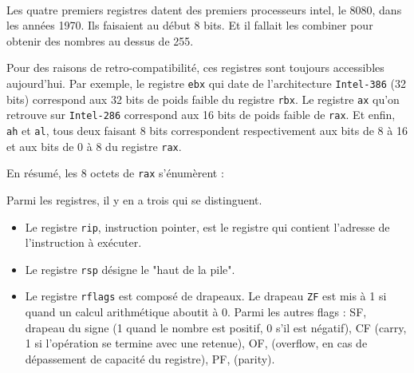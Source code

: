 \documentclass{book}
\newenvironment{commentaire}[1]{%
	\def\FrameCommand{\fboxrule=\FrameRule\fboxsep=\FrameSep \fcolorbox{yellow!50}{yellow!10}}%
	\MakeFramed {\advance\hsize-\width \FrameRestore}
	\noindent {\bf #1}\\
}%
{\endMakeFramed}
\begin{document}
\begin{commentaire}{Les registres ont une histoire}
Les quatre premiers registres datent des premiers processeurs {\sc intel}, le 8080, dans les années 1970. Ils faisaient au début 8 bits. Et il fallait les combiner pour obtenir des nombres au dessus de 255.
	
Pour des raisons de retro-compatibilité, ces registres sont toujours accessibles aujourd'hui. Par exemple, le registre {\tt ebx} qui date de l'architecture {\tt Intel-386} (32 bits) correspond aux 32 bits de poids faible du registre {\tt rbx}. Le registre {\tt ax} qu'on retrouve sur {\tt Intel-286} correspond aux 16 bits de poids faible de {\tt rax}. Et enfin, {\tt ah} et {\tt al}, tous deux faisant 8 bits correspondent respectivement aux bits de 8 à 16 et aux bits de 0 à 8 du registre {\tt rax}.
	
En résumé, les 8 octets de {\tt rax} s'énumèrent :
	\begin{center}
	\end{center}
\end{commentaire}

Parmi les registres, il y en a trois qui se distinguent. 
\begin{itemize}
	\item Le registre {\tt rip}, instruction pointer, est le registre qui contient l'adresse de l'instruction à exécuter. 
	\item Le registre {\tt rsp} désigne le "haut de la pile". 
	\item Le registre {\tt rflags} est composé de drapeaux. Le drapeau {\tt ZF} est mis à 1 si quand un calcul arithmétique aboutit à 0. Parmi les autres flags : SF, drapeau du signe (1 quand le nombre est positif, 0 s'il est négatif), CF (carry, 1 si l'opération se termine avec une retenue), OF, (overflow, en cas de dépassement de capacité du registre), PF, (parity). 
\end{itemize} 
\end{document}
